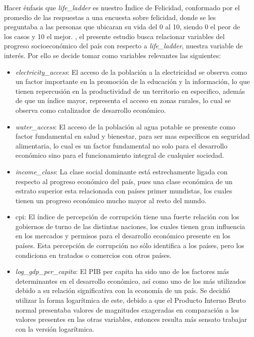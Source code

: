 \newpage

Hacer énfasis que \textit{life\_ladder} es nuestro Índice de Felicidad, conformado por el promedio de las respuestas a una encuesta sobre felicidad, donde se les preguntaba a las personas que ubicaran su vida del 0 al 10, siendo 0 el peor de los casos y 10 el mejor. , el presente estudio busca relacionar variables del progreso socioeconómico del país con respecto a \textit{life\_ladder}, nuestra variable de interés. Por ello se decide tomar como variables relevantes las siguientes:

\begin{itemize}
    \item \textit{electricity\_access}: El acceso de la población a la electricidad se observa como un factor importante en la promoción de la educación y la información, lo que tienen repercusión en la productividad de un territorio en especifico, además de que un índice mayor, representa el acceso en zonas rurales, lo cual se observa como catalizador de desarrollo económico.
    \item \textit{water\_access}: El acceso de la población al agua potable se presente como factor fundamental en salud y bienestar, para ser mas específicos en seguridad alimentaria, lo cual es un factor fundamental no solo para el desarrollo económico sino para el funcionamiento integral de cualquier sociedad.
    \item \textit{income\_class}: La clase social dominante está estrechamente ligada con respecto al progreso económico del país, pues una clase económica de un estrato superior esta relacionada con países primer mundistas, los cuales tienen un progreso económico mucho mayor al resto del mundo.
    \item cpi: El índice de percepción de corrupción tiene una fuerte relación con los gobiernos de turno de las distintas naciones, los cuales tienen gran influencia en los mercados y permisos para el desarrollo económico presente en los países. Esta percepción de corrupción no sólo identifica a los países, pero los condiciona en tratados o comercios con otros países. 
    \item \textit{log\_gdp\_per\_capita}: El PIB per capita ha sido uno de los factores más determinantes en el desarrollo económico, así como uno de los más utilizados debido a su relación significativa con la economía de un país. Se decidió utilizar la forma logarítmica de este, debido a que el Producto Interno Bruto normal presentaba valores de magnitudes exageradas en comparación a los valores presentes en las otras variables, entonces resulta más sensato trabajar con la versión logarítmica.
\end{itemize}


